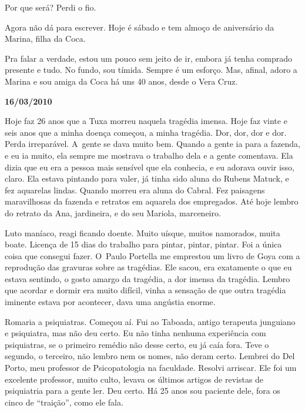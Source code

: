Por que será? Perdi o fio.

Agora não dá para escrever. Hoje é sábado e tem almoço de aniversário da
Marina, filha da Coca.

Pra falar a verdade, estou um pouco sem jeito de ir, embora já tenha
comprado presente e tudo. No fundo, sou tímida. Sempre é um esforço. Mas,
afinal, adoro a Marina e sou amiga da Coca há uns 40 anos, desde o Vera
Cruz.

\begin{center}\textbf{\asterisc{}}\end{center}


\begin{flushright}\textbf{16/03/2010}\end{flushright}


Hoje faz 26 anos que a Tuxa morreu naquela tragédia imensa. Hoje faz
vinte e seis anos que a minha doença começou, a minha tragédia. Dor,
dor, dor e dor. Perda irreparável. A~gente se dava muito bem. Quando a
gente ia para a fazenda, e eu ia muito, ela sempre me mostrava o
trabalho dela e a gente comentava. Ela dizia que eu era a pessoa mais
sensível que ela conhecia, e eu adorava ouvir isso, claro. Ela estava
pintando para valer, já tinha sido aluna do Rubens Matuck, e fez
aquarelas lindas. Quando morreu era aluna do Cabral. Fez paisagens
maravilhosas da fazenda e retratos em aquarela dos empregados. Até hoje
lembro do retrato da Ana, jardineira, e do seu Mariola, marceneiro.

Luto maníaco, reagi ficando doente. Muito uísque, muitos namorados,
muita boate. Licença de 15 dias do trabalho para pintar, pintar, pintar.
Foi a única coisa que consegui fazer. O~Paulo Portella me emprestou um
livro de Goya com a reprodução das gravuras sobre as tragédias. Ele
sacou, era exatamente o que eu estava sentindo, o gosto amargo da
tragédia, a dor imensa da tragédia. Lembro que acordar e dormir era
muito difícil, vinha a sensação de que outra tragédia iminente estava
por acontecer, dava uma angústia enorme.

Romaria a psiquiatras. Começou aí. Fui ao Taboada, antigo terapeuta
junguiano e psiquiatra, mas não deu certo. Eu não tinha nenhuma
experiência com psiquiatras, se o primeiro remédio não desse certo, eu
já caía fora. Teve o segundo, o terceiro, não lembro nem os nomes, não
deram certo. Lembrei do Del Porto, meu professor de Psicopatologia na
faculdade. Resolvi arriscar. Ele foi um excelente professor, muito
culto, levava os últimos artigos de revistas de psiquiatria para a gente
ler. Deu certo. Há 25 anos sou paciente dele, fora os cinco de
``traição'', como ele fala.


